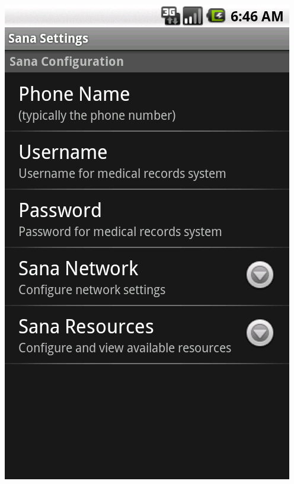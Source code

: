 \documentclass[a4paper,10pt]{article}
\begin{document}
\includegraphics[scale=0.2,keepaspectratio=true]{client_settings.png}
\end{document}
